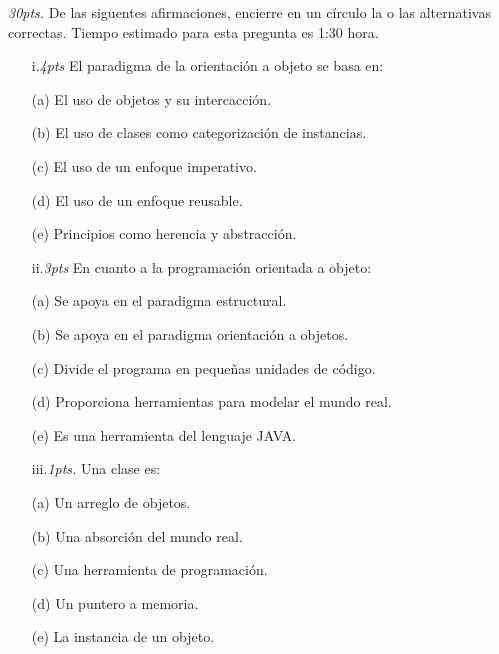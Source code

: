 \documentclass[10pt]{article}
\begin{document}
\begin{enumerate}
   {\scriptsize
    \item \emph{30pts.} De las siguentes afirmaciones, encierre en un c\'irculo la o las alternativas correctas. Tiempo estimado para esta pregunta  es 1:30 hora.
    \begin{multicols}{2}

    \begin{enumerate}[label=(\alph*)]
        \item[i.\emph{4pts}] El paradigma de la orientaci\'on a objeto se basa en:
        \item[(a)] El uso de objetos y su intercacci\'on.
        \item[(b)] El uso de clases como categorizaci\'on de instancias.
        \item[(c)] El uso de un enfoque imperativo.
        \item[(d)] El uso de un enfoque reusable.
        \item[(e)] Principios como herencia y abstracci\'on.
    \end{enumerate}

    \begin{enumerate}[label=(\alph*)]
        \item[ii.\emph{3pts}] En cuanto a la programaci\'on orientada a objeto:
        \item[(a)] Se apoya en el paradigma estructural.
        \item[(b)] Se apoya en el paradigma orientaci\'on a objetos.
        \item[(c)] Divide el programa en peque\~nas unidades de c\'odigo.
        \item[(d)] Proporciona herramientas para modelar el mundo real.
        \item[(e)] Es una herramienta del lenguaje JAVA.
    \end{enumerate}

    \begin{enumerate}[label=(\alph*)]
        \item[iii.\emph{1pts.}] Una clase es:
        \item[(a)] Un arreglo de objetos.
        \item[(b)] Una absorci\'on del mundo real.
        \item[(c)] Una herramienta de programaci\'on.
        \item[(d)] Un puntero a memoria.
        \item[(e)] La instancia de un objeto.
    \end{enumerate}


\end{multicols}}
\end{enumerate}
\end{document}
